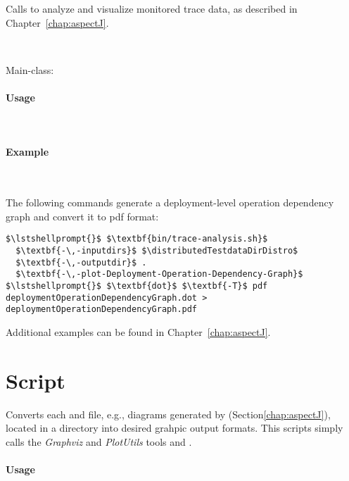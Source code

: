 Calls \KiekerTraceAnalysis{} to analyze and visualize monitored trace data, %
as described in Chapter~\ref{chap:aspectJ}.

\

\noindent Main-class: {\small {}}

\pagebreak

\paragraph*{Usage}\

\setTextListing


\paragraph*{Example}\

\noindent The following commands generate a deployment-level operation dependency 
graph and convert it to pdf format:

\enlargethispage{1cm}

\setTextListing
\begin{lstlisting}
$\lstshellprompt{}$ $\textbf{bin/trace-analysis.sh}$
  $\textbf{-\,-inputdirs}$ $\distributedTestdataDirDistro$ 
  $\textbf{-\,-outputdir}$ . 
  $\textbf{-\,-plot-Deployment-Operation-Dependency-Graph}$
$\lstshellprompt{}$ $\textbf{dot}$ $\textbf{-T}$ pdf  deploymentOperationDependencyGraph.dot > deploymentOperationDependencyGraph.pdf
\end{lstlisting}

\noindent Additional examples can be found in Chapter~\ref{chap:aspectJ}.

\section{Script }\label{appendix:wrapperScripts:dotPicFileConverter}

Converts each  and  file, e.g., diagrams generated by %
\KiekerTraceAnalysis{} (Section\ref{chap:aspectJ}), located in a directory %
into desired grahpic output formats. %
This scripts simply calls the \textit{Graphviz} and \textit{PlotUtils} tools  and .

\paragraph*{Usage}\

